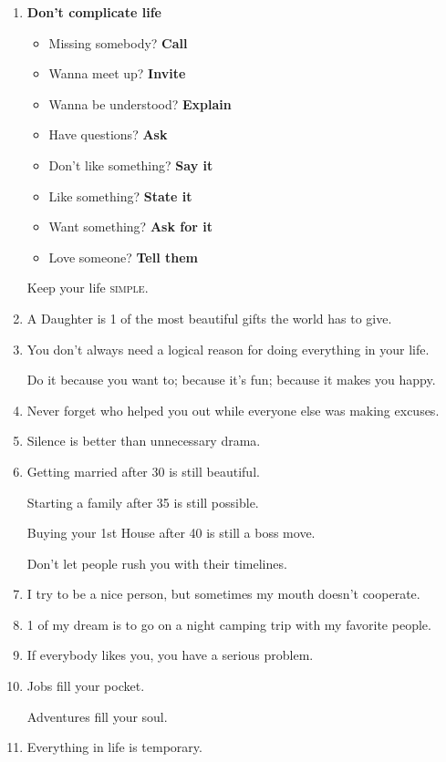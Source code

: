 \documentclass{article}
\numberwithin{equation}{section}
\begin{document}
\begin{enumerate}
    - Great, and do you have experience?
    
    - Yes, this is my 20th interview.
    \item \textbf{Don't complicate life}
    \begin{itemize}
        \item Missing somebody? \textbf{Call}
        \item Wanna meet up? \textbf{Invite}
        \item Wanna be understood? \textbf{Explain}
        \item Have questions? \textbf{Ask}
        \item Don't like something? \textbf{Say it}
        \item Like something? \textbf{State it}
        \item Want something? \textbf{Ask for it}
        \item Love someone? \textbf{Tell them}
    \end{itemize}
    Keep your life \textsc{simple}.
    \item A Daughter is 1 of the most beautiful gifts the world has to give.
    \item You don't always need a logical reason for doing everything in your life.
    
    Do it because you want to; because it's fun; because it makes you happy.
    \item Never forget who helped you out while everyone else was making excuses.
    \item Silence is better than unnecessary drama.
    \item Getting married after 30 is still beautiful.
    
    Starting a family after 35 is still possible.
    
    Buying your 1st House after 40 is still a boss move.
    
    Don't let people rush you with their timelines.
    \item I try to be a nice person, but sometimes my mouth doesn't cooperate.
    \item 1 of my dream is to go on a night camping trip with my favorite people.
    \item If everybody likes you, you have a serious problem.
    \item Jobs fill your pocket.
    
    Adventures fill your soul.
    \item Everything in life is temporary.
    

\end{enumerate}
\end{document}
